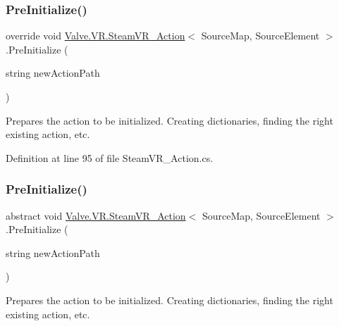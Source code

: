 \subsubsection{\texorpdfstring{PreInitialize()}{PreInitialize()}\hspace{0.1cm}{\footnotesize\ttfamily [1/2]}}
{\footnotesize\ttfamily override void \mbox{\hyperlink{class_valve_1_1_v_r_1_1_steam_v_r___action}{Valve.\+V\+R.\+Steam\+V\+R\+\_\+\+Action}}$<$ Source\+Map, Source\+Element $>$.Pre\+Initialize (\begin{DoxyParamCaption}\item[{string}]{new\+Action\+Path }\end{DoxyParamCaption})}



Prepares the action to be initialized. Creating dictionaries, finding the right existing action, etc. 



Definition at line 95 of file Steam\+V\+R\+\_\+\+Action.\+cs.

\mbox{\label{class_valve_1_1_v_r_1_1_steam_v_r___action_a8ead085a816500f060b6cfbc96b8da87}} 
\subsubsection{\texorpdfstring{PreInitialize()}{PreInitialize()}\hspace{0.1cm}{\footnotesize\ttfamily [2/2]}}
{\footnotesize\ttfamily abstract void \mbox{\hyperlink{class_valve_1_1_v_r_1_1_steam_v_r___action}{Valve.\+V\+R.\+Steam\+V\+R\+\_\+\+Action}}$<$ Source\+Map, Source\+Element $>$.Pre\+Initialize (\begin{DoxyParamCaption}\item[{string}]{new\+Action\+Path }\end{DoxyParamCaption})\hspace{0.3cm}{\ttfamily [pure virtual]}}



Prepares the action to be initialized. Creating dictionaries, finding the right existing action, etc. 

\mbox{\label{class_valve_1_1_v_r_1_1_steam_v_r___action_aab211e4315d3a39b4db1e033ae1e353b}} 
